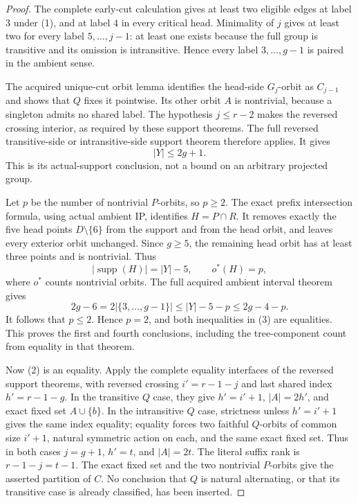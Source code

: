 \documentclass[11pt,a4paper]{article}
\begin{document}
\begin{proof}
The complete early-cut calculation gives at least two eligible
edges at label $3$ under (1), and at label $4$ in every critical
head. Minimality of $j$ gives at least two for every label
$5,\ldots,j-1$: at least one exists because the full group is
transitive and its omission is intransitive. Hence every label
$3,\ldots,g-1$ is paired in the ambient sense.

The acquired unique-cut orbit lemma identifies the head-side
$G_j$-orbit as $C_{j-1}$ and shows that $Q$ fixes it pointwise.
Its other orbit $A$ is nontrivial, because a singleton admits
no shared label. The hypothesis $j\le r-2$ makes the reversed
crossing interior, as required by these support theorems. The full reversed transitive-side or intransitive-side
support theorem therefore applies. It gives
\[
                         |Y|\le2g+1.                    \tag{2}
\]
This is its actual-support conclusion, not a bound on an arbitrary
projected group.

Let $p$ be the number of nontrivial $P$-orbits, so $p\ge2$.
The exact prefix intersection formula, using actual ambient IP,
identifies $H=P\cap R$. It removes exactly the five head points
$D\setminus\{6\}$ from the support and from the head orbit,
and leaves every exterior orbit unchanged. Since $g\ge5$, the
remaining head orbit has at least three points and is nontrivial.
Thus
\[
 |\operatorname{supp}(H)|=|Y|-5,\qquad o^*(H)=p,
\]
where $o^*$ counts nontrivial orbits. The full acquired ambient
interval theorem gives
\[
 2g-6=2|\{3,\ldots,g-1\}|
       \le |Y|-5-p\le2g-4-p.                            \tag{3}
\]
It follows that $p\le2$. Hence $p=2$, and both inequalities
in (3) are equalities. This proves the first and fourth conclusions,
including the tree-component count from equality in that theorem.

Now (2) is an equality. Apply the complete equality interfaces
of the reversed support theorems, with reversed crossing
$i'=r-1-j$ and last shared index $h'=r-1-g$. In the transitive
$Q$ case, they give $h'=i'+1$, $|A|=2h'$, and exact fixed
set $A\cup\{b\}$. In the intransitive $Q$ case, strictness
unless $h'=i'+1$ gives the same index equality; equality forces
two faithful $Q$-orbits of common size $i'+1$, natural symmetric
action on each, and the same exact fixed set. Thus in both cases
$j=g+1$, $h'=t$, and $|A|=2t$.
The literal suffix rank is $r-1-j=t-1$. The exact fixed set
and the two nontrivial $P$-orbits give the asserted partition
of $C$. No conclusion that $Q$ is natural alternating, or that
its transitive case is already classified, has been inserted.
\end{proof}
\end{document}
